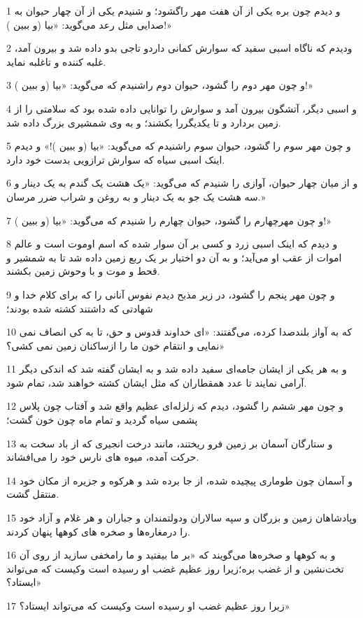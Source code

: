 \par 1 و دیدم چون بره یکی از آن هفت مهر راگشود؛ و شنیدم یکی از آن چهار حیوان به صدایی مثل رعد می‌گوید: «بیا (و ببین )!»
\par 2 ودیدم که ناگاه اسبی سفید که سوارش کمانی داردو تاجی بدو داده شد و بیرون آمد، غلبه کننده و تاغلبه نماید.
\par 3 و چون مهر دوم را گشود، حیوان دوم راشنیدم که می‌گوید: «بیا (و ببین )!»
\par 4 و اسبی دیگر، آتشگون بیرون آمد و سوارش را توانایی داده شده بود که سلامتی را از زمین بردارد و تا یکدیگررا بکشند؛ و به وی شمشیری بزرگ داده شد.
\par 5 و چون مهر سوم را گشود، حیوان سوم راشنیدم که می‌گوید: «بیا (و ببین )!» و دیدم اینک اسبی سیاه که سوارش ترازویی بدست خود دارد.
\par 6 و از میان چهار حیوان، آوازی را شنیدم که می‌گوید: «یک هشت یک گندم به یک دینار و سه هشت یک جو به یک دینار و به روغن و شراب ضرر مرسان.»
\par 7 و چون مهر‌چهارم را گشود، حیوان چهارم را شنیدم که می‌گوید: «بیا (و ببین )!»
\par 8 و دیدم که اینک اسبی زرد و کسی بر آن سوار شده که اسم اوموت است و عالم اموات از عقب او می‌آید؛ و به آن دو اختیار بر یک ربع زمین داده شد تا به شمشیر و قحط و موت و با وحوش زمین بکشند.
\par 9 و چون مهر پنجم را گشود، در زیر مذبح دیدم نفوس آنانی را که برای کلام خدا و شهادتی که داشتند کشته شده بودند؛
\par 10 که به آواز بلندصدا کرده، می‌گفتند: «ای خداوند قدوس و حق، تا به کی انصاف نمی نمایی و انتقام خون ما را ازساکنان زمین نمی کشی؟»
\par 11 و به هر یکی از ایشان جامه‌ای سفید داده شد و به ایشان گفته شد که اندکی دیگر آرامی نمایند تا عدد همقطاران که مثل ایشان کشته خواهند شد، تمام شود.
\par 12 و چون مهر ششم را گشود، دیدم که زلزله‌ای عظیم واقع شد و آفتاب چون پلاس پشمی سیاه گردید و تمام ماه چون خون گشت؛
\par 13 و ستارگان آسمان بر زمین فرو ریختند، مانند درخت انجیری که از باد سخت به حرکت آمده، میوه های نارس خود را می‌افشاند.
\par 14 و آسمان چون طوماری پیچیده شده، از جا برده شد و هرکوه و جزیره از مکان خود منتقل گشت.
\par 15 وپادشاهان زمین و بزرگان و سپه سالاران ودولتمندان و جباران و هر غلام و آزاد خود را درمغاره‌ها و صخره های کوهها پنهان کردند.
\par 16 و به کوهها و صخره‌ها می‌گویند که «بر ما بیفتید و ما رامخفی سازید از روی آن تخت‌نشین و از غضب بره؛زیرا روز عظیم غضب او رسیده است وکیست که می‌تواند ایستاد؟»
\par 17 زیرا روز عظیم غضب او رسیده است وکیست که می‌تواند ایستاد؟»

